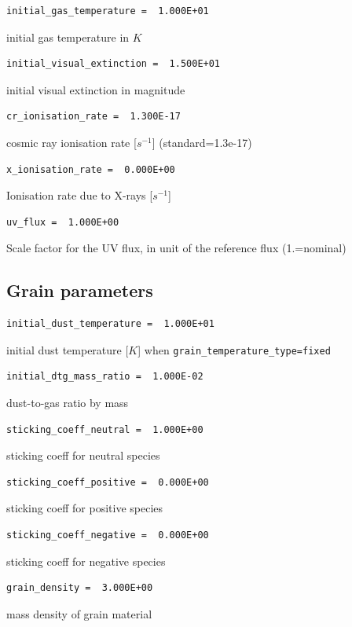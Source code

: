 \documentclass[english,a4paper,twoside]{article}
\begin{document}
\begin{verbatim}
initial_gas_temperature =  1.000E+01
\end{verbatim}
initial gas temperature  in $\unit{K}$

\begin{verbatim}
initial_visual_extinction =  1.500E+01
\end{verbatim}
initial visual extinction in magnitude

\begin{verbatim}
cr_ionisation_rate =  1.300E-17
\end{verbatim}
cosmic ray ionisation rate [$\unit{s^{-1}}$] (standard=1.3e-17)

\begin{verbatim}
x_ionisation_rate =  0.000E+00
\end{verbatim}
Ionisation rate due to X-rays [$\unit{s^{-1}}$]

\begin{verbatim}
uv_flux =  1.000E+00
\end{verbatim}
Scale factor for the UV flux, in unit of the reference flux (1.=nominal)

\subsection{Grain parameters}
\begin{verbatim}
initial_dust_temperature =  1.000E+01
\end{verbatim}
initial dust temperature [$\unit{K}$] when \verb|grain_temperature_type=fixed|

\begin{verbatim}
initial_dtg_mass_ratio =  1.000E-02
\end{verbatim}
dust-to-gas ratio by mass

\begin{verbatim}
sticking_coeff_neutral =  1.000E+00
\end{verbatim}
sticking coeff for neutral species

\begin{verbatim}
sticking_coeff_positive =  0.000E+00
\end{verbatim}
sticking coeff for positive species

\begin{verbatim}
sticking_coeff_negative =  0.000E+00
\end{verbatim}
sticking coeff for negative species

\begin{verbatim}
grain_density =  3.000E+00
\end{verbatim}
mass density of grain material
\end{document}
